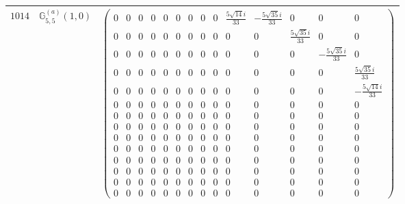 \documentclass[fleqn,8pt,landscape]{jsarticle}
\begin{document}
\begin{center}
\begin{longtable}{ccc}
$ 1014 $ & $ \mathbb{G}_{5,5}^{(a)}(1,0) $ & $ \begin{pmatrix} 0 & 0 & 0 & 0 & 0 & 0 & 0 & 0 & 0 & \frac{5 \sqrt{14} i}{33} & - \frac{5 \sqrt{35} i}{33} & 0 & 0 & 0 \\ 0 & 0 & 0 & 0 & 0 & 0 & 0 & 0 & 0 & 0 & 0 & \frac{5 \sqrt{35} i}{33} & 0 & 0 \\ 0 & 0 & 0 & 0 & 0 & 0 & 0 & 0 & 0 & 0 & 0 & 0 & - \frac{5 \sqrt{35} i}{33} & 0 \\ 0 & 0 & 0 & 0 & 0 & 0 & 0 & 0 & 0 & 0 & 0 & 0 & 0 & \frac{5 \sqrt{35} i}{33} \\ 0 & 0 & 0 & 0 & 0 & 0 & 0 & 0 & 0 & 0 & 0 & 0 & 0 & - \frac{5 \sqrt{14} i}{33} \\ 0 & 0 & 0 & 0 & 0 & 0 & 0 & 0 & 0 & 0 & 0 & 0 & 0 & 0 \\ 0 & 0 & 0 & 0 & 0 & 0 & 0 & 0 & 0 & 0 & 0 & 0 & 0 & 0 \\ 0 & 0 & 0 & 0 & 0 & 0 & 0 & 0 & 0 & 0 & 0 & 0 & 0 & 0 \\ 0 & 0 & 0 & 0 & 0 & 0 & 0 & 0 & 0 & 0 & 0 & 0 & 0 & 0 \\ 0 & 0 & 0 & 0 & 0 & 0 & 0 & 0 & 0 & 0 & 0 & 0 & 0 & 0 \\ 0 & 0 & 0 & 0 & 0 & 0 & 0 & 0 & 0 & 0 & 0 & 0 & 0 & 0 \\ 0 & 0 & 0 & 0 & 0 & 0 & 0 & 0 & 0 & 0 & 0 & 0 & 0 & 0 \\ 0 & 0 & 0 & 0 & 0 & 0 & 0 & 0 & 0 & 0 & 0 & 0 & 0 & 0 \\ 0 & 0 & 0 & 0 & 0 & 0 & 0 & 0 & 0 & 0 & 0 & 0 & 0 & 0 \end{pmatrix} $ \\ \hline

\end{longtable}
\end{center}
\end{document}
